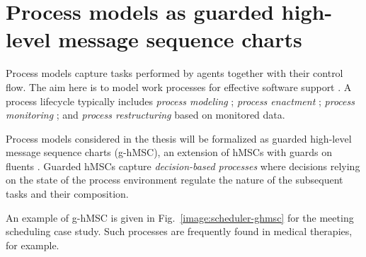 \section{Process models as guarded high-level message sequence charts\label{section:background-process-models}}

Process models capture tasks performed by agents together with their control flow. The aim here is to model work processes for effective software support \cite{Dumas:2005}. A process lifecycle typically includes \emph{process modeling} \cite{OMG:2004, OMG:2008, Clarke:2008, Damas:2009}; \emph{process enactment} \cite{Manolescu:2002, Buhler:2005, Sauer:2006}; \emph{process monitoring} \cite{Muehlen:2000}; and \emph{process restructuring} based on monitored data. 

Process models considered in the thesis will be formalized as guarded high-level message sequence charts (g-hMSC), an extension of hMSCs with guards on fluents \cite{Damas:2009}. Guarded hMSCs capture \emph{decision-based processes} where decisions relying on the state of the process environment regulate the nature of the subsequent tasks and their composition. 

An example of g-hMSC is given in Fig.~\ref{image:scheduler-ghmsc} for the meeting scheduling case study. Such processes are frequently found in medical therapies, for example.  

